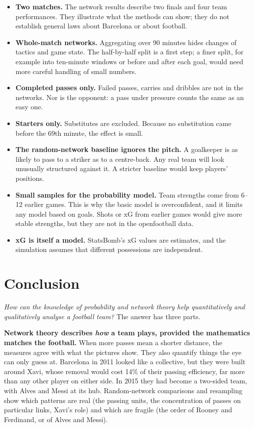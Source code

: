 \documentclass[11pt,a4paper]{article}
\begin{document}
\begin{itemize}
\item \textbf{Two matches.} The network results describe two finals and four team performances. They illustrate what the methods can show; they do not establish general laws about Barcelona or about football.
\item \textbf{Whole-match networks.} Aggregating over 90 minutes hides changes of tactics and game state. The half-by-half split is a first step; a finer split, for example into ten-minute windows or before and after each goal, would need more careful handling of small numbers.
\item \textbf{Completed passes only.} Failed passes, carries and dribbles are not in the networks. Nor is the opponent: a pass under pressure counts the same as an easy one.
\item \textbf{Starters only.} Substitutes are excluded. Because no substitution came before the 69th minute, the effect is small.
\item \textbf{The random-network baseline ignores the pitch.} A goalkeeper is as likely to pass to a striker as to a centre-back. Any real team will look unusually structured against it. A stricter baseline would keep players' positions.
\item \textbf{Small samples for the probability model.} Team strengths come from 6--12 earlier games. This is why the basic model is overconfident, and it limits any model based on goals. Shots or xG from earlier games would give more stable strengths, but they are not in the openfootball data.
\item \textbf{xG is itself a model.} StatsBomb's xG values are estimates, and the simulation assumes that different possessions are independent.
\end{itemize}

\section{Conclusion}\label{sec:conclusion}

\emph{How can the knowledge of probability and network theory help quantitatively and qualitatively analyse a football team?} The answer has three parts.

\textbf{Network theory describes \emph{how} a team plays, provided the mathematics matches the football.} When more passes mean a shorter distance, the measures agree with what the pictures show. They also quantify things the eye can only guess at. Barcelona in 2011 looked like a collective, but they were built around Xavi, whose removal would cost 14\% of their passing efficiency, far more than any other player on either side. In 2015 they had become a two-sided team, with Alves and Messi at its hub. Random-network comparisons and resampling show which patterns are real (the passing units, the concentration of passes on particular links, Xavi's role) and which are fragile (the order of Rooney and Ferdinand, or of Alves and Messi).
\end{document}
